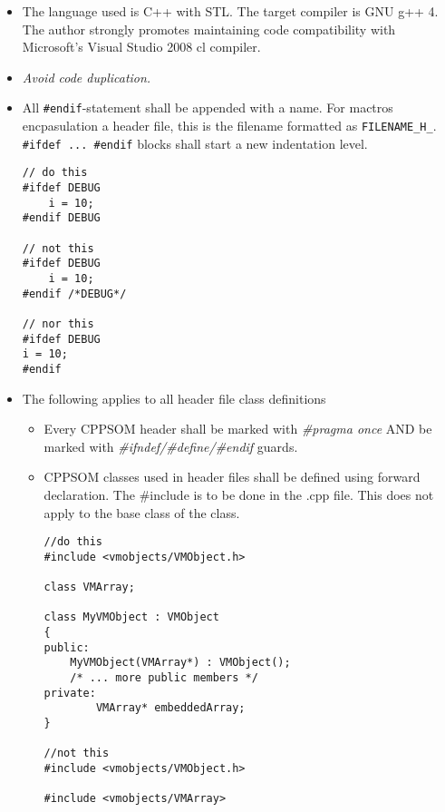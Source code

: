 \documentclass{scrartcl}
\begin{document}
\begin{itemize}
\item The language used is C++ with STL. The target compiler is GNU
 g++ 4. The author strongly promotes maintaining code compatibility
 with Microsoft's Visual Studio 2008 cl compiler.
\item \emph{Avoid code duplication.}
\item All \lstinline|#endif|-statement shall be appended with a
  name. For mactros encpasulation a header file, this is the filename
  formatted as \lstinline|FILENAME_H_|.
\lstinline|#ifdef ... #endif| blocks shall start a new indentation
level.
\begin{lstlisting}
// do this
#ifdef DEBUG
    i = 10;
#endif DEBUG

// not this
#ifdef DEBUG
    i = 10;
#endif /*DEBUG*/

// nor this
#ifdef DEBUG
i = 10;
#endif
\end{lstlisting}

\item The following applies to all header file class definitions
\begin{itemize}
\item Every CPPSOM header shall be marked with \emph{\#pragma once}
 AND be marked with \emph{\#ifndef/\#define/\#endif} guards.
\item CPPSOM classes used in header files shall be defined using
 forward declaration. The \#include is to be done in the .cpp file.
 This does not apply to the base class of the class.
\begin{lstlisting}
//do this
#include <vmobjects/VMObject.h>

class VMArray;

class MyVMObject : VMObject
{
public:
    MyVMObject(VMArray*) : VMObject();
    /* ... more public members */
private:
		VMArray* embeddedArray;
}

//not this
#include <vmobjects/VMObject.h>

#include <vmobjects/VMArray>


\end{lstlisting}
\end{itemize}
\end{itemize}
\end{document}
